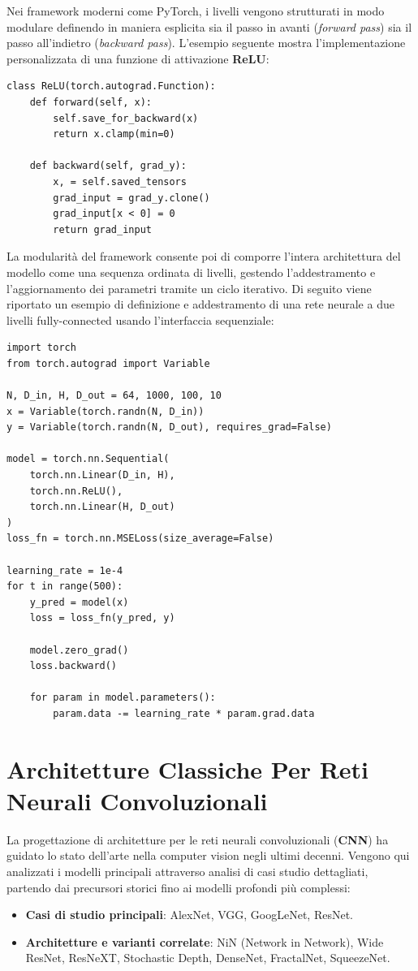﻿\documentclass[11pt, a4paper]{article}
\begin{document}
Nei framework moderni come PyTorch, i livelli vengono strutturati in modo modulare definendo in maniera esplicita sia il passo in avanti (\emph{forward pass}) sia il passo all'indietro (\emph{backward pass}). L'esempio seguente mostra l'implementazione personalizzata di una funzione di attivazione \textbf{ReLU}:

\begin{verbatim}
class ReLU(torch.autograd.Function):
    def forward(self, x):
        self.save_for_backward(x)
        return x.clamp(min=0)

    def backward(self, grad_y):
        x, = self.saved_tensors
        grad_input = grad_y.clone()
        grad_input[x < 0] = 0
        return grad_input
\end{verbatim}

La modularità del framework consente poi di comporre l'intera architettura del modello come una sequenza ordinata di livelli, gestendo l'addestramento e l'aggiornamento dei parametri tramite un ciclo iterativo. Di seguito viene riportato un esempio di definizione e addestramento di una rete neurale a due livelli fully-connected usando l'interfaccia sequenziale:

\begin{verbatim}
import torch
from torch.autograd import Variable

N, D_in, H, D_out = 64, 1000, 100, 10
x = Variable(torch.randn(N, D_in))
y = Variable(torch.randn(N, D_out), requires_grad=False)

model = torch.nn.Sequential(
    torch.nn.Linear(D_in, H),
    torch.nn.ReLU(),
    torch.nn.Linear(H, D_out)
)
loss_fn = torch.nn.MSELoss(size_average=False)

learning_rate = 1e-4
for t in range(500):
    y_pred = model(x)
    loss = loss_fn(y_pred, y)

    model.zero_grad()
    loss.backward()

    for param in model.parameters():
        param.data -= learning_rate * param.grad.data
\end{verbatim}

\newpage

\section{Architetture Classiche Per Reti Neurali Convoluzionali}

La progettazione di architetture per le reti neurali convoluzionali (\textbf{CNN}) ha guidato lo stato dell'arte nella computer vision negli ultimi decenni. Vengono qui analizzati i modelli principali attraverso analisi di casi studio dettagliati, partendo dai precursori storici fino ai modelli profondi più complessi:
\begin{itemize}
    \item \textbf{Casi di studio principali}: AlexNet, VGG, GoogLeNet, ResNet.
    \item \textbf{Architetture e varianti correlate}: NiN (Network in Network), Wide ResNet, ResNeXT, Stochastic Depth, DenseNet, FractalNet, SqueezeNet.
\end{itemize}
\end{document}
